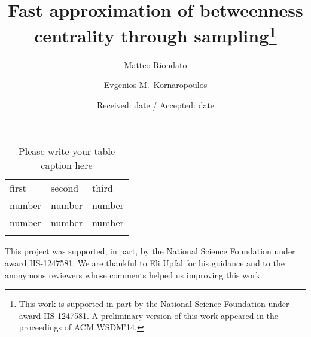 \documentclass[smallextended]{svjour3}       %
\begin{document}
\title{Fast approximation of betweenness centrality through sampling\thanks{This work is supported in part by the National Science Foundation under
award IIS-1247581. A preliminary version of this work appeared in the
proceedings of ACM WSDM'14\citep{RiondatoK14WSDM}.}}


\author{Matteo Riondato \and Evgenios M.~Kornaropoulos}



\date{Received: date / Accepted: date}

\maketitle

\begin{abstract}
  
\end{abstract}










\begin{table}
\caption{Please write your table caption here}
\label{tab:1}       %
\begin{tabular}{lll}
\hline\noalign{\smallskip}
first & second & third  \\
\noalign{\smallskip}\hline\noalign{\smallskip}
number & number & number \\
number & number & number \\
\noalign{\smallskip}\hline
\end{tabular}
\end{table}

\begin{acknowledgements}
This project was supported, in part, by the National Science Foundation under
award IIS-1247581. We are thankful to Eli Upfal for his guidance and to the
anonymous reviewers whose comments helped us improving this work.
\end{acknowledgements}



\end{document}
